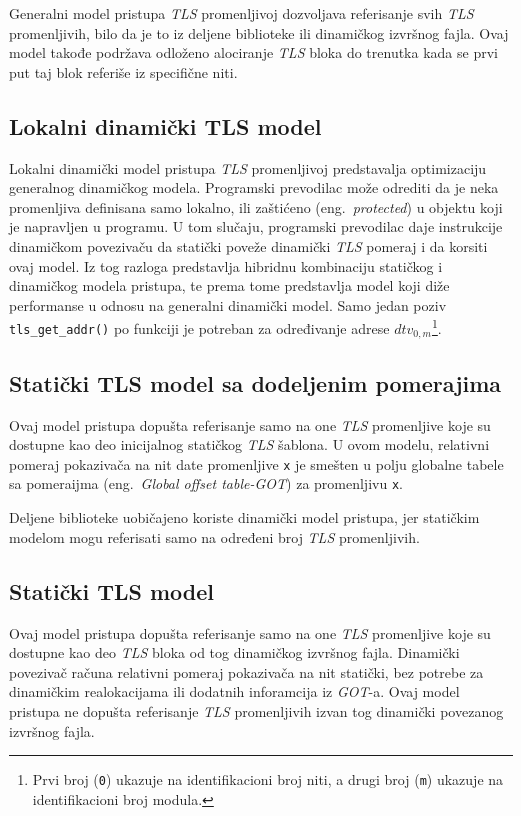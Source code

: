 \documentclass[12pt,oneside]{memoir}
\begin{document}
Generalni model pristupa \emph{TLS} promenljivoj dozvoljava referisanje svih \emph{TLS} promenljivih, bilo da je to iz deljene biblioteke ili dinamičkog izvršnog fajla. Ovaj model takođe podržava odloženo alociranje \emph{TLS} bloka do trenutka kada se prvi put taj blok referiše iz specifične niti.

\subsection{Lokalni dinamički TLS model}

Lokalni dinamički model pristupa \emph{TLS} promenljivoj predstavalja optimizaciju generalnog dinamičkog modela. Programski prevodilac može odrediti da je neka promenljiva definisana samo lokalno, ili zaštićeno (eng.~\emph{protected}) u objektu koji je napravljen u programu. U tom slučaju, programski prevodilac daje instrukcije dinamičkom povezivaču da statički poveže dinamički \emph{TLS} pomeraj i da korsiti ovaj model. Iz tog razloga predstavlja hibridnu kombinaciju statičkog i dinamičkog modela pristupa, te prema tome predstavlja model koji diže performanse u odnosu na generalni dinamički model. Samo jedan poziv \texttt{tls\_get\_addr()} po funkciji je potreban za određivanje adrese \texttt{$dtv_{0,m}$}\footnote{Prvi broj (\texttt{0}) ukazuje na identifikacioni broj niti, a drugi broj (\texttt{m}) ukazuje na identifikacioni broj modula.}.

\subsection{Statički TLS model sa dodeljenim pomerajima}

Ovaj model pristupa dopušta referisanje samo na one \emph{TLS} promenljive koje su dostupne kao deo inicijalnog statičkog \emph{TLS} šablona. U ovom modelu, relativni pomeraj pokazivača na nit date promenljive \texttt{x} je smešten u polju globalne tabele sa pomeraijma (eng.~\emph{Global offset table-GOT}) za promenljivu \texttt{x}.

Deljene biblioteke uobičajeno koriste dinamički model pristupa, jer statičkim modelom mogu referisati samo na određeni broj \emph{TLS} promenljivih.

\subsection{Statički TLS model}

Ovaj model pristupa dopušta referisanje samo na one \emph{TLS} promenljive koje su dostupne kao deo \emph{TLS} bloka od tog dinamičkog izvršnog fajla. Dinamički povezivač računa relativni pomeraj pokazivača na nit statički, bez potrebe za dinamičkim realokacijama ili dodatnih inforamcija iz \emph{GOT}-a. Ovaj model pristupa ne dopušta referisanje \emph{TLS} promenljivih izvan tog dinamički povezanog izvršnog fajla.
\end{document}
